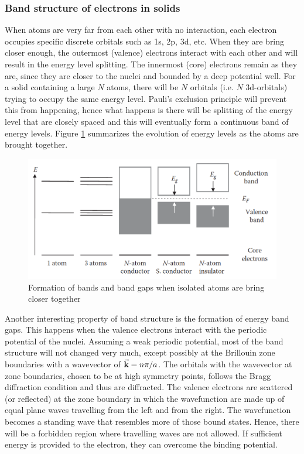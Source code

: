 \subsubsection{Band structure of electrons in solids}
When atoms are very far from each other with no interaction, each electron occupies specific discrete orbitals such as 1s, 2p, 3d, etc. When they are bring  closer enough, the outermost (valence) electrons interact with each other and will result in the  energy level splitting. The innermost (core) electrons remain as they are, since they are closer to the nuclei and bounded by a deep potential well. For a solid containing a large $N$ atoms, there will be $N$ orbitals (i.e. $N$ 3d-orbitals) trying to occupy the same energy level. Pauli's exclusion principle will prevent this from happening, hence what happens is there will be splitting of the energy level that are closely spaced and this will eventually form a continuous band of energy levels. Figure \ref{fig:band_model} summarizes the evolution of energy levels as the atoms are brought together.

\begin{figure}[tbh!]
	\centering
	\includegraphics[width=0.7\linewidth]{"images/band model"}
	\caption[Band structure in solids]{Formation of bands and band gaps when isolated atoms are bring closer together}
	\label{fig:band_model}
\end{figure}    

Another interesting property of band structure is the formation of energy band gaps. This happens when the valence electrons interact with the periodic potential of the nuclei. Assuming a weak periodic potential, most of the band structure will not changed very much, except possibly at the Brillouin zone boundaries with a wavevector of $\va{k} = n \pi/ a$. The orbitals with the wavevector at zone boundaries, chosen to be at high symmetry points, follows the Bragg diffraction condition and thus are diffracted. The valence electrons are scattered (or reflected) at the zone boundary in which the wavefunction are made up of equal plane waves travelling from the left and from the right. The wavefunction becomes a standing wave that resembles more of those bound states. Hence, there will be a forbidden region where travelling waves are not allowed. If sufficient energy is provided to the electron, they can overcome the  binding potential.

